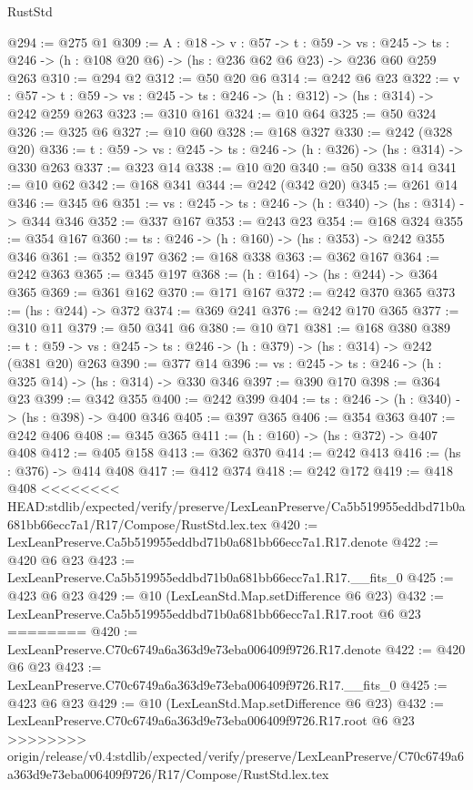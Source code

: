 \begin{lexlean}{RustStd}
\begin{coremodule}
{\begin{coremodule}
@294 := @275 @1
@309 := {A : @18} ->
  {v : @57} ->
  {t : @59} ->
  {vs : @245} -> {ts : @246} -> (h : @108 @20 @6) -> (hs : @236 @62 @6 @23) -> @236 @60 @259 @263
@310 := @294 @2
@312 := @50 @20 @6
@314 := @242 @6 @23
@322 := {v : @57} ->
  {t : @59} -> {vs : @245} -> {ts : @246} -> (h : @312) -> (hs : @314) -> @242 @259 @263
@323 := @310 @161
@324 := @10 @64
@325 := @50 @324
@326 := @325 @6
@327 := @10 @60
@328 := @168 @327
@330 := @242 (@328 @20)
@336 := {t : @59} -> {vs : @245} -> {ts : @246} -> (h : @326) -> (hs : @314) -> @330 @263
@337 := @323 @14
@338 := @10 @20
@340 := @50 @338 @14
@341 := @10 @62
@342 := @168 @341
@344 := @242 (@342 @20)
@345 := @261 @14
@346 := @345 @6
@351 := {vs : @245} -> {ts : @246} -> (h : @340) -> (hs : @314) -> @344 @346
@352 := @337 @167
@353 := @243 @23
@354 := @168 @324
@355 := @354 @167
@360 := {ts : @246} -> (h : @160) -> (hs : @353) -> @242 @355 @346
@361 := @352 @197
@362 := @168 @338
@363 := @362 @167
@364 := @242 @363
@365 := @345 @197
@368 := (h : @164) -> (hs : @244) -> @364 @365
@369 := @361 @162
@370 := @171 @167
@372 := @242 @370 @365
@373 := (hs : @244) -> @372
@374 := @369 @241
@376 := @242 @170 @365
@377 := @310 @11
@379 := @50 @341 @6
@380 := @10 @71
@381 := @168 @380
@389 := {t : @59} -> {vs : @245} -> {ts : @246} -> (h : @379) -> (hs : @314) -> @242 (@381 @20) @263
@390 := @377 @14
@396 := {vs : @245} -> {ts : @246} -> (h : @325 @14) -> (hs : @314) -> @330 @346
@397 := @390 @170
@398 := @364 @23
@399 := @342 @355
@400 := @242 @399
@404 := {ts : @246} -> (h : @340) -> (hs : @398) -> @400 @346
@405 := @397 @365
@406 := @354 @363
@407 := @242 @406
@408 := @345 @365
@411 := (h : @160) -> (hs : @372) -> @407 @408
@412 := @405 @158
@413 := @362 @370
@414 := @242 @413
@416 := (hs : @376) -> @414 @408
@417 := @412 @374
@418 := @242 @172
@419 := @418 @408
<<<<<<<< HEAD:stdlib/expected/verify/preserve/LexLeanPreserve/Ca5b519955eddbd71b0a681bb66ecc7a1/R17/Compose/RustStd.lex.tex
@420 := LexLeanPreserve.Ca5b519955eddbd71b0a681bb66ecc7a1.R17.denote
@422 := @420 @6 @23
@423 := LexLeanPreserve.Ca5b519955eddbd71b0a681bb66ecc7a1.R17.__fits_0
@425 := @423 @6 @23
@429 := @10 (LexLeanStd.Map.setDifference @6 @23)
@432 := LexLeanPreserve.Ca5b519955eddbd71b0a681bb66ecc7a1.R17.root @6 @23
========
@420 := LexLeanPreserve.C70c6749a6a363d9e73eba006409f9726.R17.denote
@422 := @420 @6 @23
@423 := LexLeanPreserve.C70c6749a6a363d9e73eba006409f9726.R17.__fits_0
@425 := @423 @6 @23
@429 := @10 (LexLeanStd.Map.setDifference @6 @23)
@432 := LexLeanPreserve.C70c6749a6a363d9e73eba006409f9726.R17.root @6 @23
>>>>>>>> origin/release/v0.4:stdlib/expected/verify/preserve/LexLeanPreserve/C70c6749a6a363d9e73eba006409f9726/R17/Compose/RustStd.lex.tex

\end{coremodule}}
\end{coremodule}
\end{lexlean}
